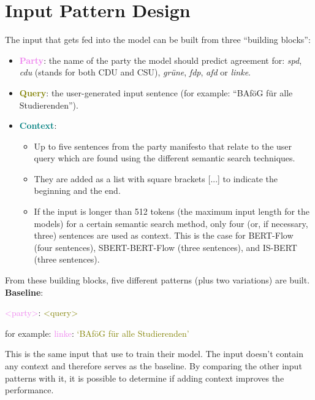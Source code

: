 \section{Input Pattern Design} \label{exp_patterns}

The input that gets fed into the model can be built from three ``building blocks'':

\begin{itemize}
    \item \textcolor{violet}{\textbf{Party}}: the name of the party the model should predict agreement for: \textit{spd}, \textit{cdu} (stands for both CDU and CSU), \textit{grüne}, \textit{fdp}, \textit{afd} or \textit{linke}.
    \item \textcolor{olive}{\textbf{Query}}: the user-generated input sentence (for example: ``BAföG für alle Studierenden'').
    \item \textcolor{teal}{\textbf{Context}}: 
    \begin{itemize}
        \item Up to five sentences from the party manifesto that relate to the user query which are found using the different semantic search techniques.
        \item They are added as a list with square brackets [...] to indicate the beginning and the end.
        \item If the input is longer than 512 tokens (the maximum input length for the models) for a certain semantic search method, only four (or, if necessary, three) sentences are used as context. This is the case for BERT-Flow (four sentences), SBERT-BERT-Flow (three sentences), and IS-BERT (three sentences).
    \end{itemize}
\end{itemize}

From these building blocks, five different patterns (plus two variations) are built.\\

\textbf{Baseline}:

\begin{center}
    \textcolor{violet}{<party>}: \textcolor{olive}{<query>}
\end{center}
for example: \textcolor{violet}{linke}: \textcolor{olive}{‘BAföG für alle Studierenden’} 

This is the same input that \citet{witte_2022} use to train their model. The input doesn't contain any context and therefore serves as the baseline. By comparing the other input patterns with it, it is possible to determine if adding context improves the performance.\\

